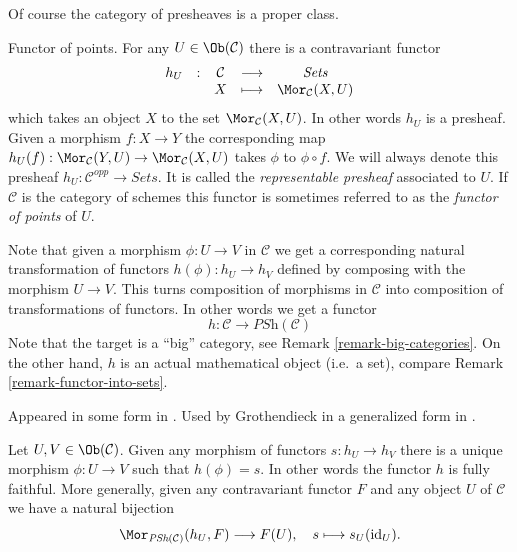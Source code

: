 \noindent
Of course the category of presheaves is a proper class.

\begin{example}
\label{example-hom-functor}
Functor of points.
For any $U\in \Ob(\mathcal{C})$ there is a contravariant
functor
$$
\begin{matrix}
h_U & : & \mathcal{C}
&
\longrightarrow
&
\textit{Sets} \\
& &
X
&
\longmapsto
&
\Mor_\mathcal{C}(X, U)
\end{matrix}
$$
which takes an object $X$ to the set
$\Mor_\mathcal{C}(X, U)$. In other words $h_U$ is a presheaf.
Given a morphism $f : X\to Y$ the corresponding map
$h_U(f) : \Mor_\mathcal{C}(Y, U)\to \Mor_\mathcal{C}(X, U)$
takes $\phi$ to $\phi\circ f$. We will always denote
this presheaf $h_U : \mathcal{C}^{opp} \to \textit{Sets}$.
It is called the {\it representable presheaf} associated to $U$.
If $\mathcal{C}$ is the category of schemes this functor is
sometimes referred to as the
\emph{functor of points} of $U$.
\end{example}

\noindent
Note that given a morphism $\phi : U \to V$ in $\mathcal{C}$ we get a
corresponding natural transformation of functors $h(\phi) : h_U \to h_V$
defined by composing with the morphism $U \to V$. This turns
composition of morphisms in $\mathcal{C}$ into composition of
transformations of functors. In other words we get a functor
$$
h :
\mathcal{C}
\longrightarrow
\textit{PSh}(\mathcal{C})
$$
Note that the target is a ``big'' category, see
Remark \ref{remark-big-categories}. On the other hand,
$h$ is an actual mathematical object (i.e.\ a set), compare Remark
\ref{remark-functor-into-sets}.

\begin{lemma}
\label{lemma-yoneda}
\begin{reference}
Appeared in some form in \cite{Yoneda-homology}. Used by Grothendieck in a
generalized form in \cite{Gr-II}.
\end{reference}
Let $U, V \in \Ob(\mathcal{C})$.
Given any morphism of functors $s : h_U \to h_V$
there is a unique morphism $\phi : U \to V$
such that $h(\phi) = s$. In other words the
functor $h$ is fully faithful. More generally,
given any contravariant functor $F$ and any object
$U$ of $\mathcal{C}$ we have a natural bijection
$$
\Mor_{\textit{PSh}(\mathcal{C})}(h_U, F) \longrightarrow F(U),
\quad
s \longmapsto s_U(\text{id}_U).
$$
\end{lemma}


